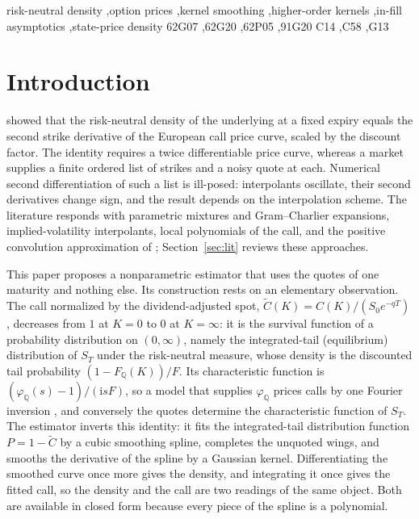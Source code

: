 \documentclass[preprint,12pt,authoryear,times]{elsarticle}
\newcommand{\Q}{\mathbb{Q}}
\newcommand{\Ct}{\tilde C}
\begin{document}
\begin{frontmatter}
\begin{keyword}
risk-neutral density \sep option prices \sep kernel smoothing \sep higher-order kernels \sep in-fill asymptotics \sep state-price density
\MSC[2010] 62G07 \sep 62G20 \sep 62P05 \sep 91G20
\JEL C14 \sep C58 \sep G13
\end{keyword}

\end{frontmatter}

\section{Introduction}
\label{sec:intro}

\citet{breeden1978} showed that the risk-neutral density of the underlying at a fixed expiry equals the second strike derivative of the European call price curve, scaled by the discount factor. The identity requires a twice differentiable price curve, whereas a market supplies a finite ordered list of strikes and a noisy quote at each. Numerical second differentiation of such a list is ill-posed: interpolants oscillate, their second derivatives change sign, and the result depends on the interpolation scheme. The literature responds with parametric mixtures and Gram--Charlier expansions, implied-volatility interpolants, local polynomials of the call, and the positive convolution approximation of \citet{bondarenko2003}; Section~\ref{sec:lit} reviews these approaches.

This paper proposes a nonparametric estimator that uses the quotes of one maturity and nothing else. Its construction rests on an elementary observation. The call normalized by the dividend-adjusted spot, \(\Ct(K)=C(K)/(S_0e^{-qT})\), decreases from \(1\) at \(K=0\) to \(0\) at \(K=\infty\): it is the survival function of a probability distribution on \((0,\infty)\), namely the integrated-tail (equilibrium) distribution of \(S_T\) under the risk-neutral measure, whose density is the discounted tail probability \((1-F_{\Q}(K))/F\). Its characteristic function is \((\varphi_{\Q}(s)-1)/(\mathrm{i}sF)\), so a model that supplies \(\varphi_{\Q}\) prices calls by one Fourier inversion \citep{lewis2000}, and conversely the quotes determine the characteristic function of \(S_T\). The estimator inverts this identity: it fits the integrated-tail distribution function \(P=1-\Ct\) by a cubic smoothing spline, completes the unquoted wings, and smooths the derivative of the spline by a Gaussian kernel. Differentiating the smoothed curve once more gives the density, and integrating it once gives the fitted call, so the density and the call are two readings of the same object. Both are available in closed form because every piece of the spline is a polynomial.
\end{document}
